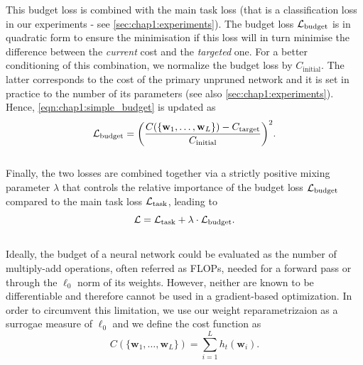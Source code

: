 \noindent This budget loss is combined with the main task loss (that is a
classification loss in our experiments - see \cref{sec:chap1:experiments}). The
budget loss $ {\cal L}_\text{budget}$ is in quadratic form to ensure the
minimisation if this loss will in turn minimise the difference between the {\em
current} cost and the {\em targeted} one. For a better  conditioning of this
combination, we normalize the budget loss by $C_\text{initial}$. The latter
corresponds to the cost of the primary unpruned network and it is set in
practice to the number of its parameters (see also
\cref{sec:chap1:experiments}). Hence, \cref{eqn:chap1:simple_budget} is updated
as  \\

\begin{equation}
  \label{eqn:chap1:real_budget}
  {\cal L}_\text{budget} = \biggl( \displaystyle\frac{C(\{\mathbf{w}_1,\dots, \mathbf{w}_L\}) - C_\text{target}}{C_\text{initial}} \biggr)^2.
\end{equation}\\

Finally, the two losses are combined together via a strictly positive mixing
parameter $\lambda$ that  controls the relative importance of  the budget loss
${\cal L}_\text{budget}$ compared to the main task loss ${\cal L}_\text{task}$,
leading to\\

\begin{equation}
  \label{eqn:chap1:globalloss}
   {\cal L} =  {\cal L}_\text{task} + \lambda \cdot {\cal L}_\text{budget}.
\end{equation} \\

Ideally, the budget of a neural network could be evaluated as the number of
multiply-add operations, often referred as \ac{FLOPs}, needed for a forward pass
or through the $\ell_0$ norm of its weights. However, neither are known to be
differentiable and therefore cannot be used in a gradient-based optimization. In
order to circumvent this limitation, we use our weight reparametrizaion as a
surrogae measure of $\ell_0$ and we define the cost function as \\

\begin{equation}
  \label{eqn:chap1:cost_function}
  C(\{\mathbf{w}_1,\dots, \mathbf{w}_L\}) = \displaystyle \sum_{i=1}^{L} h_t(\mathbf{w}_i). 
\end{equation} \\


